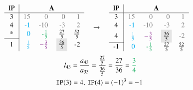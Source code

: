 \documentclass[10pt,a4paper]{article}
\begin{document}
	\begin{align*}
		\begin{tabular}{c|rrrr}
			IP &                                                     \multicolumn{4}{c}{\textbf{A}}                                                      \\ \hline
			3  &                   \textcolor{gray}{15} &                 \textcolor{gray}{0} &                \textcolor{gray}{0} & \textcolor{gray}{1} \\
			4  &            \textcolor{ProcessBlue}{-1} &               \textcolor{gray}{-10} &               \textcolor{gray}{-3} & \textcolor{gray}{2} \\
			*  &             \textcolor{ProcessBlue}{0} &   \textcolor{Green}{-$\frac{1}{5}$} &                     $\frac{27}{5}$ &      $\frac{52}{5}$ \\ \cline{1-1}
			1  & \textcolor{ProcessBlue}{$\frac{1}{5}$} & \textcolor{Fuchsia}{$-\frac{3}{5}$} & \colorbox{gray!20}{$\frac{36}{5}$}\hspace{-0.1cm} &                  -2
		\end{tabular}
			\quad \rightarrow \quad
		\begin{tabular}{c|rrrr}
			IP &                                                     \multicolumn{4}{c}{\textbf{A}}                                                      \\ \hline
			3  &                   \textcolor{gray}{15} &                 \textcolor{gray}{0} &                \textcolor{gray}{0} & \textcolor{gray}{1} \\
			4  &            \textcolor{ProcessBlue}{-1} &               \textcolor{gray}{-10} &               \textcolor{gray}{-3} & \textcolor{gray}{2} \\
			4  & \textcolor{ProcessBlue}{$\frac{1}{5}$} & \textcolor{Fuchsia}{$-\frac{3}{5}$} & \colorbox{gray!20}{$\frac{36}{5}$}\hspace{-0.1cm} & \textcolor{gray}{-2} \\ \cline{1-1}
			-1  &             \textcolor{ProcessBlue}{0} &   \textcolor{Green}{-$\frac{1}{5}$} &                     $\frac{27}{5}$ &      $\frac{52}{5}$
		\end{tabular}
	\end{align*}
	\begin{align*}
		l_{43} = \frac{a_{43}}{a_{33}} = \frac{\frac{27}{5}}{\frac{36}{5}} = \frac{27}{36} = \textcolor{Green}{\frac{3}{4}} \\
		\texttt{IP}(3)=4,\,\texttt{IP}(4)=(-1)^3=-1 \hspace{-0.3cm}
	\end{align*}
\end{document}
